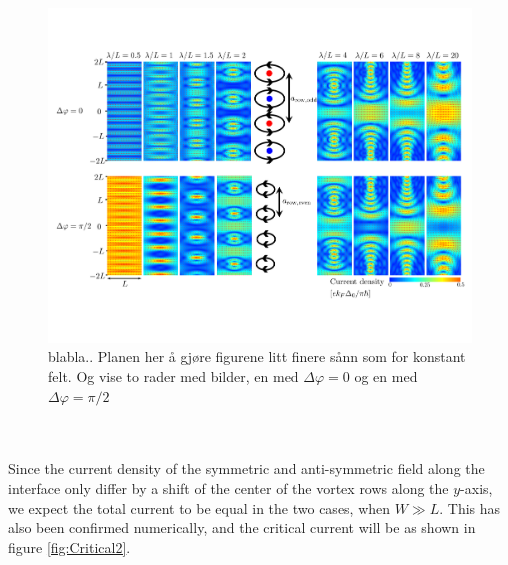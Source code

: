 \begin{figure}[hhh]
\centering
\includegraphics[width=17cm,clip=true,trim = 0cm 5cm 0cm 2cm]{fig/Dist2}
\caption{blabla.. Planen her å gjøre figurene litt finere sånn som for konstant felt. Og vise to rader med bilder, en med $\Delta \varphi = 0$ og en med $\Delta \varphi = \pi/2$}
\label{fig:Dist2}
\end{figure}
\\
\\
Since the current density of the symmetric and anti-symmetric field along the interface only differ by a shift of the center of the vortex rows along the $y$-axis, we expect the total current to be equal in the two cases, when $W \gg L$. This has also been confirmed numerically, and the critical current will be as shown in figure \ref{fig:Critical2}.